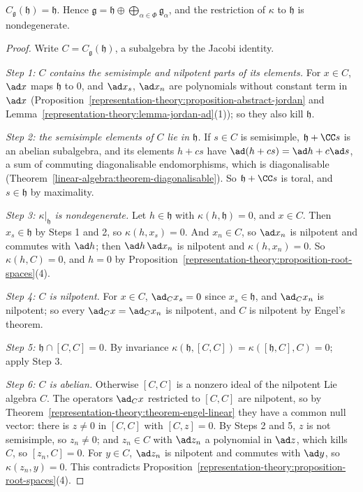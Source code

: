 \begin{theorem}\label{representation-theory:theorem-centraliser-cartan}
$C_{\mathfrak{g}}(\mathfrak{h}) = \mathfrak{h}$. Hence $\mathfrak{g} = \mathfrak{h} \oplus \bigoplus_{\alpha \in \Phi}\mathfrak{g}_\alpha$, and the restriction of $\kappa$ to
$\mathfrak{h}$ is nondegenerate.
\end{theorem}

\begin{proof}
Write $C = C_{\mathfrak{g}}(\mathfrak{h})$, a subalgebra by the Jacobi identity.

\emph{Step 1: $C$ contains the semisimple and nilpotent parts of its elements.} For $x \in C$, $\ad x$ maps $\mathfrak{h}$ to $0$, and $\ad x_s$, $\ad x_n$ are polynomials without
constant term in $\ad x$ (Proposition~\ref{representation-theory:proposition-abstract-jordan} and Lemma~\ref{representation-theory:lemma-jordan-ad}(1)); so they also kill
$\mathfrak{h}$.

\emph{Step 2: the semisimple elements of $C$ lie in $\mathfrak{h}$.} If $s \in C$ is semisimple, $\mathfrak{h} + \CC s$ is an abelian subalgebra, and its elements $h + cs$ have
$\ad(h + cs) = \ad h + c\ad s$, a sum of commuting diagonalisable endomorphisms, which is diagonalisable (Theorem~\ref{linear-algebra:theorem-diagonalisable}). So $\mathfrak{h} + \CC s$ is
toral, and $s \in \mathfrak{h}$ by maximality.

\emph{Step 3: $\kappa|_{\mathfrak{h}}$ is nondegenerate.} Let $h \in \mathfrak{h}$ with $\kappa(h, \mathfrak{h}) = 0$, and $x \in C$. Then $x_s \in \mathfrak{h}$ by Steps 1 and 2, so
$\kappa(h, x_s) = 0$. And $x_n \in C$, so $\ad x_n$ is nilpotent and commutes with $\ad h$; then $\ad h\,\ad x_n$ is nilpotent and $\kappa(h, x_n) = 0$. So $\kappa(h, C) = 0$, and
$h = 0$ by Proposition~\ref{representation-theory:proposition-root-spaces}(4).

\emph{Step 4: $C$ is nilpotent.} For $x \in C$, $\ad_Cx_s = 0$ since $x_s \in \mathfrak{h}$, and $\ad_Cx_n$ is nilpotent; so every $\ad_Cx = \ad_Cx_n$ is nilpotent, and $C$ is
nilpotent by Engel's theorem.

\emph{Step 5: $\mathfrak{h} \cap [C, C] = 0$.} By invariance $\kappa(\mathfrak{h}, [C, C]) = \kappa([\mathfrak{h}, C], C) = 0$; apply Step 3.

\emph{Step 6: $C$ is abelian.} Otherwise $[C, C]$ is a nonzero ideal of the nilpotent Lie algebra $C$. The operators $\ad_Cx$ restricted to $[C, C]$ are nilpotent, so by
Theorem~\ref{representation-theory:theorem-engel-linear} they have a common null vector: there is $z \neq 0$ in $[C, C]$ with $[C, z] = 0$. By Steps 2 and 5, $z$ is not semisimple,
so $z_n \neq 0$; and $z_n \in C$ with $\ad z_n$ a polynomial in $\ad z$, which kills $C$, so $[z_n, C] = 0$. For $y \in C$, $\ad z_n$ is nilpotent and commutes with $\ad y$, so
$\kappa(z_n, y) = 0$. This contradicts Proposition~\ref{representation-theory:proposition-root-spaces}(4).


\end{proof}

